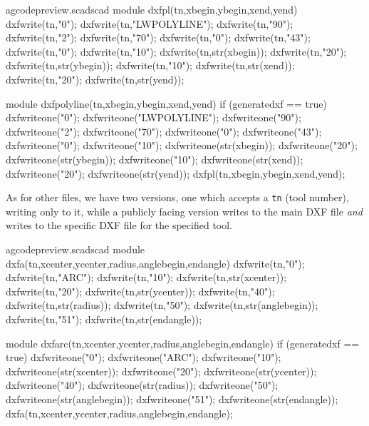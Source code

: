 \documentclass{ltxdoc}
\begin{document}
\lstset{firstnumber=\thegcpscad}
\begin{writecode}{a}{gcodepreview.scad}{scad}
module dxfpl(tn,xbegin,ybegin,xend,yend) {
    dxfwrite(tn,"0");
    dxfwrite(tn,"LWPOLYLINE");
    dxfwrite(tn,"90");
    dxfwrite(tn,"2");
    dxfwrite(tn,"70");
    dxfwrite(tn,"0");
    dxfwrite(tn,"43");
    dxfwrite(tn,"0");
    dxfwrite(tn,"10");
    dxfwrite(tn,str(xbegin));
    dxfwrite(tn,"20");
    dxfwrite(tn,str(ybegin));
    dxfwrite(tn,"10");
    dxfwrite(tn,str(xend));
    dxfwrite(tn,"20");
    dxfwrite(tn,str(yend));
}

module dxfpolyline(tn,xbegin,ybegin,xend,yend) {
if (generatedxf == true) {
    dxfwriteone("0");
    dxfwriteone("LWPOLYLINE");
    dxfwriteone("90");
    dxfwriteone("2");
    dxfwriteone("70");
    dxfwriteone("0");
    dxfwriteone("43");
    dxfwriteone("0");
    dxfwriteone("10");
    dxfwriteone(str(xbegin));
    dxfwriteone("20");
    dxfwriteone(str(ybegin));
    dxfwriteone("10");
    dxfwriteone(str(xend));
    dxfwriteone("20");
    dxfwriteone(str(yend));
    dxfpl(tn,xbegin,ybegin,xend,yend);
    }
}

\end{writecode}
\addtocounter{gcpscad}{41}

%
As for other files, we have two versions, one which accepts a \texttt{tn} (tool number),
writing only to it, while a publicly facing version writes to the main DXF file \emph{and}
writes to the specific DXF file for the specified tool.

\lstset{firstnumber=\thegcpscad}
\begin{writecode}{a}{gcodepreview.scad}{scad}
module dxfa(tn,xcenter,ycenter,radius,anglebegin,endangle) {
    dxfwrite(tn,"0");
    dxfwrite(tn,"ARC");
    dxfwrite(tn,"10");
    dxfwrite(tn,str(xcenter));
    dxfwrite(tn,"20");
    dxfwrite(tn,str(ycenter));
    dxfwrite(tn,"40");
    dxfwrite(tn,str(radius));
    dxfwrite(tn,"50");
    dxfwrite(tn,str(anglebegin));
    dxfwrite(tn,"51");
    dxfwrite(tn,str(endangle));
}

module dxfarc(tn,xcenter,ycenter,radius,anglebegin,endangle) {
if (generatedxf == true) {
    dxfwriteone("0");
    dxfwriteone("ARC");
    dxfwriteone("10");
    dxfwriteone(str(xcenter));
    dxfwriteone("20");
    dxfwriteone(str(ycenter));
    dxfwriteone("40");
    dxfwriteone(str(radius));
    dxfwriteone("50");
    dxfwriteone(str(anglebegin));
    dxfwriteone("51");
    dxfwriteone(str(endangle));
    dxfa(tn,xcenter,ycenter,radius,anglebegin,endangle);
    }
}

\end{writecode}
\addtocounter{gcpscad}{33}
 
\end{document}
